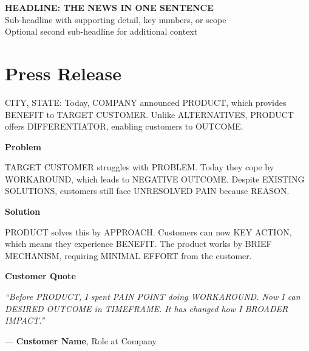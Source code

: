 \documentclass[11pt,letterpaper]{article}
\newcommand{\prsection}[1]{%
  \vspace{1em}%
  {\large\bfseries\color{SectionBlue}#1}%
  \vspace{0.3em}\par%
}
\begin{document}
\begin{center}
  {\LARGE\bfseries\color{SectionBlue} HEADLINE: THE NEWS IN ONE SENTENCE} \\[0.8em]
  {\large\color{AccentGray} Sub-headline with supporting detail, key numbers, or scope} \\[0.3em]
  {\large\color{AccentGray} Optional second sub-headline for additional context}
\end{center}

\vspace{0.5em}


\section*{Press Release}

CITY, STATE: Today, COMPANY announced PRODUCT, which provides BENEFIT
to TARGET CUSTOMER. Unlike ALTERNATIVES, PRODUCT offers DIFFERENTIATOR,
enabling customers to OUTCOME.

\prsection{Problem}

TARGET CUSTOMER struggles with PROBLEM. Today they cope by WORKAROUND,
which leads to NEGATIVE OUTCOME. Despite EXISTING SOLUTIONS, customers
still face UNRESOLVED PAIN because REASON.

\prsection{Solution}

PRODUCT solves this by APPROACH. Customers can now KEY ACTION, which means
they experience BENEFIT. The product works by BRIEF MECHANISM, requiring
MINIMAL EFFORT from the customer.

\prsection{Customer Quote}

\begin{customerquote}
\textit{``Before PRODUCT, I spent PAIN POINT doing WORKAROUND. Now I can
DESIRED OUTCOME in TIMEFRAME. It has changed how I BROADER IMPACT.''}

\raggedleft --- \textbf{Customer Name}, Role at Company
\end{customerquote}
\end{document}
